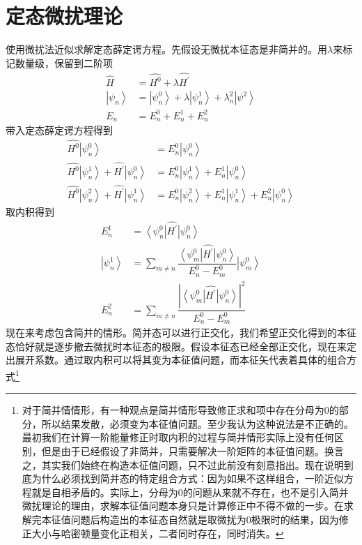\documentclass[12pt, a4paper, oneside]{ctexart}
\begin{document}
	\section{定态微扰理论}
	使用微扰法近似求解定态薛定谔方程。先假设无微扰本征态是非简并的。用$\lambda$来标记数量级，保留到二阶项
	\begin{align}
		\hat{H}&=\hat{H^{0}}+\lambda\hat{H^{\prime}}\\
		\left|\psi_{n}\right>&=\left|\psi^{0}_{n}\right>+\lambda\left|\psi^{1}_{n}\right>+\lambda^{2}_{n}\left|\psi^{2}\right>\\
		E_{n}&=E_{n}^{0}+E_{n}^{1}+E_{n}^{2}
	\end{align}
	\quad\quad 带入定态薛定谔方程得到
	\begin{align}
		\hat{H^{0}}\left|\psi_{n}^{0}\right>&=E_{n}^{0}\left|\psi_{n}^{0}\right>\\
		\hat{H^{0}}\left|\psi_{n}^{1}\right>+\hat{H^{\prime}}\left|\psi_{n}^{0}\right>&=E_{n}^{0}\left|\psi_{n}^{1}\right>+E_{n}^{1}\left|\psi_{n}^{0}\right>\\
		\hat{H^{0}}\left|\psi_{n}^{2}\right>+\hat{H^{\prime}}\left|\psi_{n}^{1}\right>&=E_{n}^{0}\left|\psi_{n}^{2}\right>+E_{n}^{1}\left|\psi_{n}^{1}\right>+E_{n}^{2}\left|\psi_{n}^{0}\right>
	\end{align}
	\quad\quad 取内积得到
	\begin{align}
		E_{n}^{1}&=\left<\psi_{n}^{0}\right|\hat{H^{\prime}}\left|\psi_{n}^{0}\right>\\
		\left|\psi_{n}^{1}\right>&=\sum_{m\ne n}\dfrac{\left<\psi_{m}^{0}\right|\hat{H^{\prime}}\left|\psi_{n}^{0}\right>}{E_{n}^{0}-E_{m}^{0}}\left|\psi_{m}^{0}\right>\\
		E_{n}^{2}&=\sum_{m\ne n}\dfrac{\left|\left<\psi_{m}^{0}\right|\hat{H^{\prime}}\left|\psi_{n}^{0}\right>\right|^{2}}{E_{n}^{0}-E_{m}^{0}}
	\end{align}
	\quad\quad 现在来考虑包含简并的情形。简并态可以进行正交化，我们希望正交化得到的本征态恰好就是逐步撤去微扰时本征态的极限。假设本征态已经全部正交化，现在来定出展开系数。通过取内积可以将其变为本征值问题，而本征矢代表着具体的组合方式\footnote{对于简并情情形，有一种观点是简并情形导致修正求和项中存在分母为$0$的部分，所以结果发散，必须变为本征值问题。至少我认为这种说法是不正确的。最初我们在计算一阶能量修正时取内积的过程与简并情形实际上没有任何区别，但是由于已经假设了非简并，只需要解决一阶矩阵的本征值问题。换言之，其实我们始终在构造本征值问题，只不过此前没有刻意指出。现在说明到底为什么必须找到简并态的特定组合方式：因为如果不这样组合，一阶近似方程就是自相矛盾的。实际上，分母为$0$的问题从来就不存在，也不是引入简并微扰理论的理由，求解本征值问题本身只是计算修正中不得不做的一步。在求解完本征值问题后构造出的本征态自然就是取微扰为$0$极限时的结果，因为修正大小与哈密顿量变化正相关，二者同时存在，同时消失。}
\end{document}
